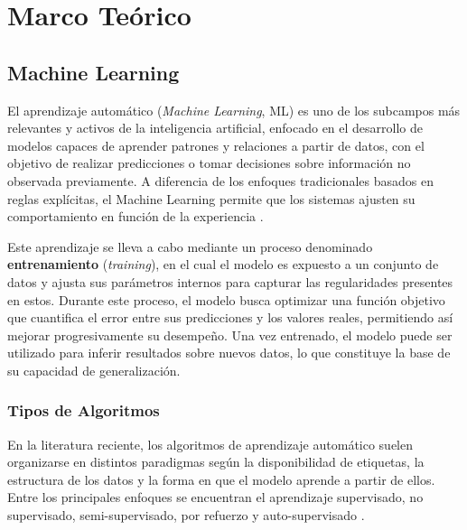 \chapter{Marco Teórico}

\section{Machine Learning}

El aprendizaje automático (\textit{Machine Learning}, ML) es uno de los subcampos más relevantes y activos de la inteligencia 
artificial, enfocado en el desarrollo de modelos capaces de aprender patrones y relaciones a partir de datos, con el 
objetivo de realizar predicciones o tomar decisiones sobre información no observada previamente. A diferencia de los 
enfoques tradicionales basados en reglas explícitas, el Machine Learning permite que los sistemas ajusten su 
comportamiento en función de la experiencia \textcite{sarker2021machine}.

Este aprendizaje se lleva a cabo mediante un proceso denominado \textbf{entrenamiento} (\textit{training}), en el cual el 
modelo es expuesto a un conjunto de datos y ajusta sus parámetros internos para capturar las regularidades presentes en 
estos. Durante este proceso, el modelo busca optimizar una función objetivo que cuantifica el error entre sus predicciones 
y los valores reales, permitiendo así mejorar progresivamente su desempeño. Una vez entrenado, el modelo puede ser 
utilizado para inferir resultados sobre nuevos datos, lo que constituye la base de su capacidad de generalización.


\subsection{Tipos de Algoritmos}  

En la literatura reciente, los algoritmos de aprendizaje automático suelen organizarse en distintos paradigmas según la 
disponibilidad de etiquetas, la estructura de los datos y la forma en que el modelo aprende a partir de ellos. Entre los 
principales enfoques se encuentran el aprendizaje supervisado, no supervisado, semi-supervisado, por refuerzo y 
auto-supervisado \textcite{Liam_2025,9941371}. 

